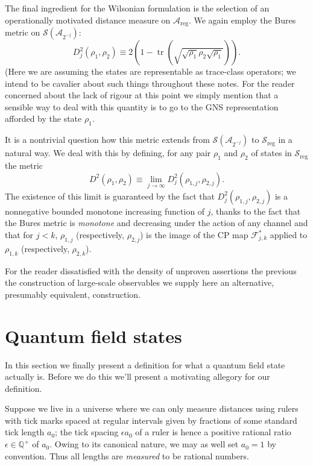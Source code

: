 \documentclass[11pt]{amsart}
\DeclareMathOperator{\tr}{tr}
\theoremstyle{plain}%
\theoremstyle{definition}
\theoremstyle{remark}
\begin{document}
The final ingredient for the Wilsonian formulation is the selection of an operationally motivated distance measure on $\mathcal{A}_{\text{reg}}$. We again employ the Bures metric on $\mathcal{S}(\mathcal{A}_{2^{-j}})$:
\begin{equation}
	D^2_j(\rho_1,\rho_2) \equiv 2\left(1-\tr\left(\sqrt{\sqrt{\rho_1}\rho_2\sqrt{\rho_1}}\right)\right).
\end{equation}
(Here we are assuming the states are representable as trace-class operators; we intend to be cavalier about such things throughout these notes. For the reader concerned about the lack of rigour at this point we simply mention that a sensible way to deal with this quantity is to go to the GNS representation afforded by the state $\rho_1$. 

It is a nontrivial question how this metric extends from $\mathcal{S}(\mathcal{A}_{2^{-j}})$ to $\mathcal{S}_{\text{reg}}$ in a natural way. We deal with this by defining, for any pair $\rho_1$ and $\rho_2$ of states in $\mathcal{S}_{\text{reg}}$ the metric
\begin{equation}
	D^2(\rho_1,\rho_2) \equiv \lim_{j\rightarrow\infty}  D^2_j(\rho_{1,j},\rho_{2,j}).
\end{equation}
The existence of this limit is guaranteed by the fact that $D^2_j(\rho_{1,j},\rho_{2,j})$ is a nonnegative bounded monotone increasing function of $j$, thanks to the fact that the Bures metric is \emph{monotone} and decreasing under the action of any channel and that for $j<k$, $\rho_{1,j}$ (respectively, $\rho_{2,j}$) is the image of the CP map $\mathcal{F}_{j,k}^{*}$ applied to $\rho_{1,k}$ (respectively, $\rho_{2,k}$). 

For the reader dissatisfied with the density of unproven assertions the previous the construction of large-scale observables we supply here an alternative, presumably equivalent, construction.

\section{Quantum field states}\label{sec:qftcompletion}
In this section we finally present a definition for what a quantum field state actually is. Before we do this we'll present a motivating allegory for our definition. 

Suppose we live in a universe where we can only measure distances using rulers with tick marks spaced at regular intervals given by fractions of some standard tick length $a_0$; the tick spacing $\epsilon a_0$ of a ruler is hence a positive rational ratio $\epsilon \in \mathbb{Q}^+$ of $a_0$. Owing to its canonical nature, we may as well set $a_0 = 1$ by convention. Thus all lengths are \emph{measured} to be rational numbers. 
\end{document}
